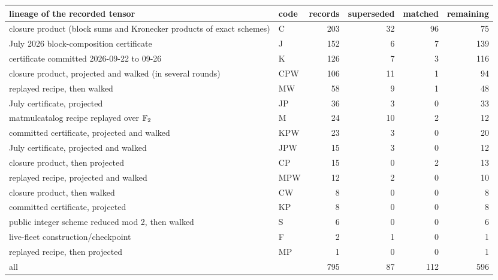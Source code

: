 \begin{tabular}{@{}p{7.2cm}lrrrr@{}}\toprule
lineage of the recorded tensor & code & records & superseded & matched & remaining\\\midrule
closure product (block sums and Kronecker products of exact schemes) & C & 203 & 32 & 96 & 75\\
July 2026 block-composition certificate & J & 152 & 6 & 7 & 139\\
certificate committed 2026-09-22 to 09-26 & K & 126 & 7 & 3 & 116\\
closure product, projected and walked (in several rounds) & CPW & 106 & 11 & 1 & 94\\
replayed recipe, then walked & MW & 58 & 9 & 1 & 48\\
July certificate, projected & JP & 36 & 3 & 0 & 33\\
matmulcatalog recipe replayed over ${\mathbb{F}_2}$ & M & 24 & 10 & 2 & 12\\
committed certificate, projected and walked & KPW & 23 & 3 & 0 & 20\\
July certificate, projected and walked & JPW & 15 & 3 & 0 & 12\\
closure product, then projected & CP & 15 & 0 & 2 & 13\\
replayed recipe, projected and walked & MPW & 12 & 2 & 0 & 10\\
closure product, then walked & CW & 8 & 0 & 0 & 8\\
committed certificate, projected & KP & 8 & 0 & 0 & 8\\
public integer scheme reduced mod 2, then walked & S & 6 & 0 & 0 & 6\\
live-fleet construction/checkpoint & F & 2 & 1 & 0 & 1\\
replayed recipe, then projected & MP & 1 & 0 & 0 & 1\\
\midrule
all & & 795 & 87 & 112 & 596\\
\bottomrule\end{tabular}
